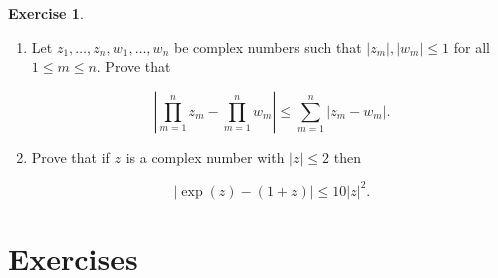 \documentclass[11pt]{report}
\theoremstyle{plain}
\theoremstyle{definition}
\newtheorem{xexercise}[thm]{Exercise}
\begin{document}
\begin{xexercise}

\begin{enumerate}[label=(\roman*)]
\item Let $z_1,\ldots,z_n, w_1,\ldots, w_n$ be complex
numbers such that $|z_m|, |w_m|\le 1$ for all
$1\le m\le n$. Prove that

\[
\left|\prod_{m=1}^n z_m - \prod_{m=1}^n w_m \right| \le \sum_{m=1}^n |z_m-w_m|.
\]

\item Prove that if $z$ is a complex number with $|z|\le 2$
then

\[
|\exp(z)-(1+z)| \le 10 |z|^2.
\]
\end{enumerate}

\end{xexercise}

\chapter*{Exercises}
\end{document}
